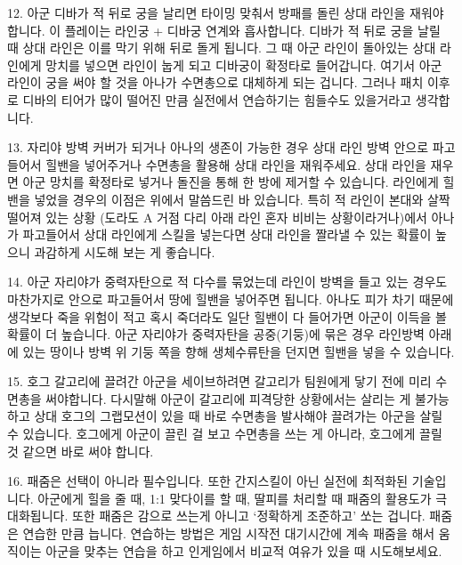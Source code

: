  



12. 아군 디바가 적 뒤로 궁을 날리면 타이밍 맞춰서 방패를 돌린 상대 라인을 재워야 합니다. 이 플레이는 라인궁 + 디바궁 연계와 흡사합니다. 디바가 적 뒤로 궁을 날릴 때 상대 라인은 이를 막기 위해 뒤로 돌게 됩니다. 그 때 아군 라인이 돌아있는 상대 라인에게 망치를 넣으면 라인이 눕게 되고 디바궁이 확정타로 들어갑니다. 여기서 아군 라인이 궁을 써야 할 것을 아나가 수면총으로 대체하게 되는 겁니다. 그러나 패치 이후로 디바의 티어가 많이 떨어진 만큼 실전에서 연습하기는 힘들수도 있을거라고 생각합니다.

 

13. 자리야 방벽 커버가 되거나 아나의 생존이 가능한 경우 상대 라인 방벽 안으로 파고들어서 힐밴을 넣어주거나 수면총을 활용해 상대 라인을 재워주세요. 상대 라인을 재우면 아군 망치를 확정타로 넣거나 돌진을 통해 한 방에 제거할 수 있습니다. 라인에게 힐밴을 넣었을 경우의 이점은 위에서 말씀드린 바 있습니다. 특히 적 라인이 본대와 살짝 떨어져 있는 상황 (도라도 A 거점 다리 아래 라인 혼자 비비는 상황이라거나)에서 아나가 파고들어서 상대 라인에게 스킬을 넣는다면 상대 라인을 짤라낼 수 있는 확률이 높으니 과감하게 시도해 보는 게 좋습니다.

 



14. 아군 자리야가 중력자탄으로 적 다수를 묶었는데 라인이 방벽을 들고 있는 경우도 마찬가지로 안으로 파고들어서 땅에 힐밴을 넣어주면 됩니다. 아나도 피가 차기 때문에 생각보다 죽을 위험이 적고 혹시 죽더라도 일단 힐밴이 다 들어가면 아군이 이득을 볼 확률이 더 높습니다. 아군 자리야가 중력자탄을 공중(기둥)에 묶은 경우 라인방벽 아래에 있는 땅이나 방벽 위 기둥 쪽을 향해 생체수류탄을 던지면 힐밴을 넣을 수 있습니다.

 



15. 호그 갈고리에 끌려간 아군을 세이브하려면 갈고리가 팀원에게 닿기 전에 미리 수면총을 써야합니다. 다시말해 아군이 갈고리에 피격당한 상황에서는 살리는 게 불가능하고 상대 호그의 그랩모션이 있을 때 바로 수면총을 발사해야 끌려가는 아군을 살릴 수 있습니다. 호그에게 아군이 끌린 걸 보고 수면총을 쓰는 게 아니라, 호그에게 끌릴 것 같으면 바로 써야 합니다.

 

16. 패줌은 선택이 아니라 필수입니다. 또한 간지스킬이 아닌 실전에 최적화된 기술입니다. 아군에게 힐을 줄 때, 1:1 맞다이를 할 때, 딸피를 처리할 때 패줌의 활용도가 극대화됩니다. 또한 패줌은 감으로 쓰는게 아니고 ‘정확하게 조준하고’ 쏘는 겁니다. 패줌은 연습한 만큼 늡니다. 연습하는 방법은 게임 시작전 대기시간에 계속 패줌을 해서 움직이는 아군을 맞추는 연습을 하고 인게임에서 비교적 여유가 있을 때 시도해보세요.

